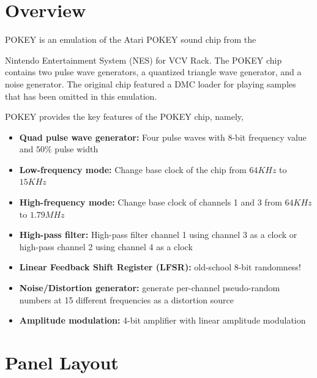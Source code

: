 \documentclass[12pt,a4paper]{article}
\begin{document}

\section{Overview}

POKEY is an emulation of the Atari POKEY sound chip from the

Nintendo Entertainment System (NES) for VCV Rack. The POKEY chip contains two pulse wave generators, a quantized triangle wave generator, and a noise generator. The original chip featured a DMC loader for playing samples that has been omitted in this emulation.

POKEY provides the key features of the POKEY chip, namely,
\begin{itemize}
  \item \textbf{Quad pulse wave generator:} Four pulse waves with 8-bit frequency value and $50\%$ pulse width
  \item \textbf{Low-frequency mode:} Change base clock of the chip from $64 KHz$ to $15 KHz$
  \item \textbf{High-frequency mode:} Change base clock of channels 1 and 3 from $64 KHz$ to $1.79 MHz$
  \item \textbf{High-pass filter:} High-pass filter channel 1 using channel 3 as a clock or high-pass channel 2 using channel 4 as a clock
  \item \textbf{Linear Feedback Shift Register (LFSR):} old-school 8-bit randomness!
  \item \textbf{Noise/Distortion generator:} generate per-channel pseudo-random numbers at 15 different frequencies as a distortion source
  \item \textbf{Amplitude modulation:} 4-bit amplifier with linear amplitude modulation
\end{itemize}


\section{Panel Layout}
\end{document}
